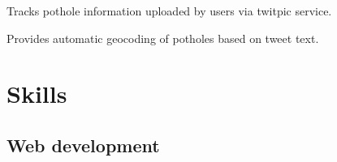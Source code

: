 \documentclass{resume}
\begin{document}
\begin{compactitem}
  \item Tracks pothole information uploaded by users via twitpic service.
  \item Provides automatic geocoding of potholes based on tweet text.
\end{compactitem}

\section{Skills}

\subsection{Web development}
\end{document}
